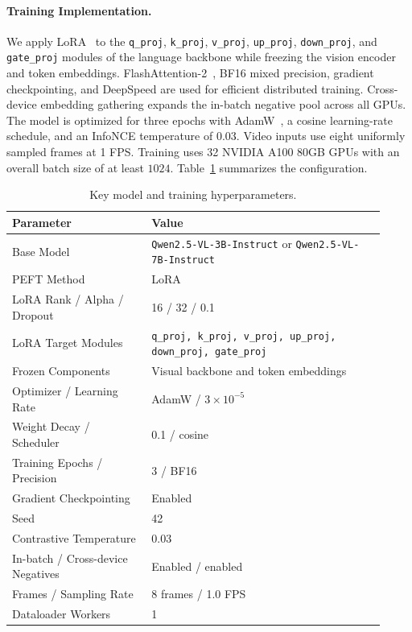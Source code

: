 \FloatBarrier
\paragraph{Training Implementation.}
We apply LoRA~\cite{hu2021lora} to the \texttt{q\_proj}, \texttt{k\_proj}, \texttt{v\_proj}, \texttt{up\_proj}, \texttt{down\_proj}, and \texttt{gate\_proj} modules of the language backbone while freezing the vision encoder and token embeddings. FlashAttention-2~\cite{dao2023flashattention}, BF16 mixed precision, gradient checkpointing, and DeepSpeed are used for efficient distributed training. Cross-device embedding gathering expands the in-batch negative pool across all GPUs. The model is optimized for three epochs with AdamW~\cite{loshchilov2017decoupled}, a cosine learning-rate schedule, and an InfoNCE temperature of $0.03$. Video inputs use eight uniformly sampled frames at 1 FPS. Training uses 32 NVIDIA A100 80GB GPUs with an overall batch size of at least $1024$. Table~\ref{gve:tab:training_hyperparameters} summarizes the configuration.

\begin{table}[t]
\centering
\caption{Key model and training hyperparameters.}
\label{gve:tab:training_hyperparameters}
\begin{tabular}{@{}p{0.34\linewidth}p{0.58\linewidth}@{}}
\toprule
\textbf{Parameter} & \textbf{Value} \\
\midrule
Base Model & \texttt{Qwen2.5-VL-3B-Instruct} or \texttt{Qwen2.5-VL-7B-Instruct} \\
PEFT Method & LoRA \\
LoRA Rank / Alpha / Dropout & 16 / 32 / 0.1 \\
LoRA Target Modules & \texttt{q\_proj, k\_proj, v\_proj, up\_proj, down\_proj, gate\_proj} \\
Frozen Components & Visual backbone and token embeddings \\
Optimizer / Learning Rate & AdamW / $3\times10^{-5}$ \\
Weight Decay / Scheduler & 0.1 / cosine \\
Training Epochs / Precision & 3 / BF16 \\
Gradient Checkpointing & Enabled \\
Seed & 42 \\
Contrastive Temperature & 0.03 \\
In-batch / Cross-device Negatives & Enabled / enabled \\
Frames / Sampling Rate & 8 frames / 1.0 FPS \\
Dataloader Workers & 1 \\
\bottomrule
\end{tabular}
\end{table}

